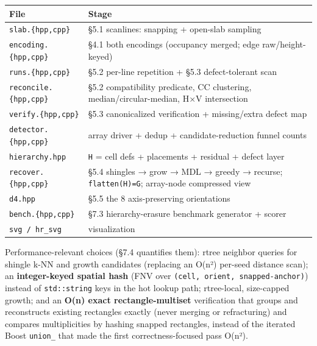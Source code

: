 \documentclass[
  11pt,
]{article}
\newcounter{none} %
\begin{document}
{\def\LTcaptype{none} %
\begin{longtable}[]{@{}
  >{\raggedright\arraybackslash}p{}
  >{\raggedright\arraybackslash}p{}@{}}
\toprule\noalign{}
\begin{minipage}[b]{\linewidth}\raggedright
File
\end{minipage} & \begin{minipage}[b]{\linewidth}\raggedright
Stage
\end{minipage} \\
\midrule\noalign{}
\endhead
\bottomrule\noalign{}
\endlastfoot
\texttt{slab.\{hpp,cpp\}} & §5.1 scanlines: snapping + open-slab
sampling \\
\texttt{encoding.\{hpp,cpp\}} & §4.1 both encodings (occupancy merged;
edge raw/height-keyed) \\
\texttt{runs.\{hpp,cpp\}} & §5.2 per-line repetition + §5.3
defect-tolerant scan \\
\texttt{reconcile.\{hpp,cpp\}} & §5.2 compatibility predicate, CC
clustering, median/circular-median, H×V intersection \\
\texttt{verify.\{hpp,cpp\}} & §5.3 canonicalized verification +
missing/extra defect map \\
\texttt{detector.\{hpp,cpp\}} & array driver + dedup +
candidate-reduction funnel counts \\
\texttt{hierarchy.hpp} & \texttt{H} = cell defs + placements + residual
+ defect layer \\
\texttt{recover.\{hpp,cpp\}} & §5.4 shingles → grow → MDL → greedy →
recurse; \texttt{flatten(H)=G}; array-node compressed view \\
\texttt{d4.hpp} & §5.5 the 8 axis-preserving orientations \\
\texttt{bench.\{hpp,cpp\}} & §7.3 hierarchy-erasure benchmark generator
+ scorer \\
\texttt{svg\ /\ hr\_svg} & visualization \\
\end{longtable}
}

Performance-relevant choices (§7.4 quantifies them): rtree neighbor
queries for shingle k-NN and growth candidates (replacing an O(n²)
per-seed distance scan); an \textbf{integer-keyed spatial hash} (FNV
over \texttt{(cell,\ orient,\ snapped-anchor)}) instead of
\texttt{std::string} keys in the hot lookup path; rtree-local,
size-capped growth; and an \textbf{O(n) exact rectangle-multiset}
verification that groups and reconstructs existing rectangles exactly
(never merging or refracturing) and compares multiplicities by hashing
snapped rectangles, instead of the iterated Boost \texttt{union\_} that
made the first correctness-focused pass O(n²).
\end{document}
